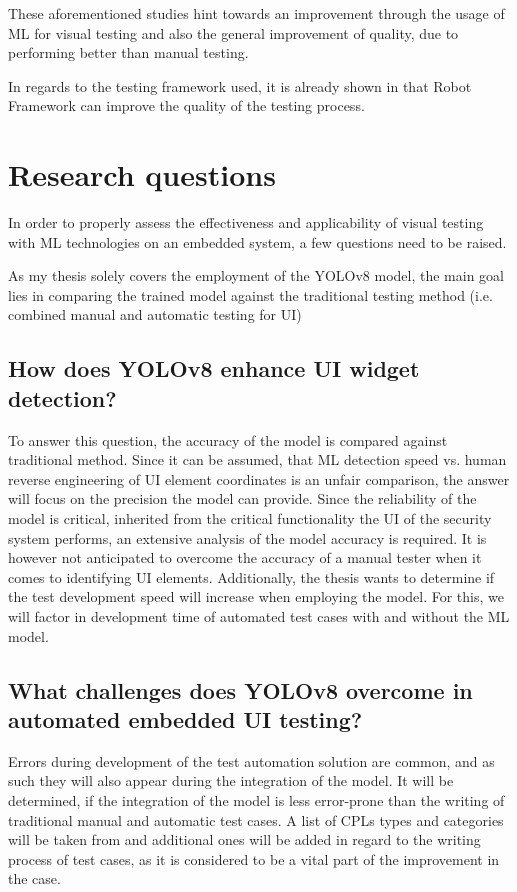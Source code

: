 \documentclass[Proposal,BIC,english,IEEE]{BASE/twbook} %
\begin{document}
These aforementioned studies hint towards an improvement through the usage of ML for visual testing and also the general improvement of quality, due to performing better than manual testing.

In regards to the testing framework used, it is already shown\autocite{walkerSoftwareTestAutomation2020} in that Robot Framework can improve the quality of the testing process.

\newpage
\chapter{Research questions}
In order to properly assess the effectiveness and applicability of visual testing with ML technologies on an embedded system, a few questions need to be raised.

As my thesis solely covers the employment of the YOLOv8 model, the main goal lies in comparing the trained model against the traditional testing method (i.e. combined manual and automatic testing for UI)
\section{How does YOLOv8 enhance UI widget detection?}
To answer this question, the accuracy of the model is compared against traditional method. Since it can be assumed, that ML detection speed vs. human reverse engineering of UI element coordinates is an unfair comparison, the answer will focus on the precision the model can provide.
Since the reliability of the model is critical, inherited from the critical functionality the UI of the security system performs, an extensive analysis of the model accuracy is required.
It is however not anticipated to overcome the accuracy of a manual tester when it comes to identifying UI elements.
Additionally, the thesis wants to determine if the test development speed will increase when employing the model. For this, we will factor in development time of automated test cases with and without the ML model.

\section{What challenges does YOLOv8 overcome in automated embedded UI testing?}
Errors during development of the test automation solution are common, and as such they will also appear during the integration of the model.
It will be determined, if the integration of the model is less error-prone than the writing of traditional manual and automatic test cases.
A list of CPLs types and categories will be taken from \autocite{alegrothVisualGUITesting2015} and additional ones will be added in regard to the writing process of test cases, as it is considered to be a vital part of the improvement in the case.
\end{document}
